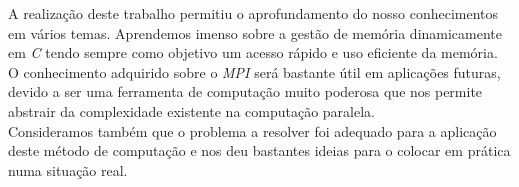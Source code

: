 \documentclass{llncs}
\begin{document}
A realização deste trabalho permitiu o aprofundamento do nosso conhecimentos em vários temas. Aprendemos imenso sobre a gestão de memória dinamicamente em \textit{C} tendo sempre como objetivo um acesso rápido e uso eficiente da memória. \\

O conhecimento adquirido sobre o \textit{MPI} será bastante útil em aplicações futuras, devido a ser uma ferramenta de computação muito poderosa que nos permite abstrair da complexidade existente na computação paralela. \\

Consideramos também que o problema a resolver foi adequado para a aplicação deste método de computação e nos deu bastantes ideias para o colocar em prática numa situação real.


\end{document}
